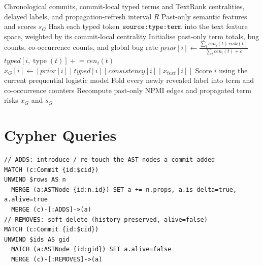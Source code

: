 \documentclass[final,5p,times,twocolumn]{elsarticle}
\DeclareRobustCommand{\code}[1]{%
  \ifmmode
    \text{\normalfont\ttfamily\detokenize{#1}}%
  \else
    {\normalfont\ttfamily\detokenize{#1}}%
  \fi
}
\theoremstyle{plain}
\begin{document}
\begin{algorithm}[!htbp]
\caption{Online CSTG semantic channel}
\label{alg:gchannel}
\small
\begin{algorithmic}[1]
\Require Chronological commits, commit-local typed terms and TextRank centralities,
  delayed labels, and propagation-refresh interval $R$
\Ensure Past-only semantic features and scores $s_G$
\State Hash each typed token $\code{source:type:term}$ into the text feature space,
  weighted by its commit-local centrality
\State Initialise past-only term totals, bug counts, co-occurrence counts, and global bug rate
  \State $prior[i]\gets
    \frac{\sum_t cen_i(t)\,risk(t)}{\sum_t cen_i(t)+\varepsilon}$
    \State $typed[i,\operatorname{type}(t)]\mathrel{+}=cen_i(t)$
  \EndFor
  \State $x_G[i]\gets[prior[i]\mid typed[i]\mid consistency[i]\mid x_{text}[i]]$
  \State Score $i$ using the current prequential logistic model
  \State Fold every newly revealed label into term and co-occurrence counters
    \State Recompute past-only NPMI edges and propagated term risks
  \EndIf
\EndFor
\State \Return $x_G$ and $s_G$
\end{algorithmic}
\end{algorithm}

\FloatBarrier
\section{Cypher Queries}
\label{app:cypher-queries}


\begin{lstlisting}[style=cypher,caption={AST change layer: the delta edges written per commit (\texttt{ADDS} and \texttt{REMOVES} shown; \texttt{UPDATES}/\texttt{MOVES} in Appendix~\ref{app:cypher}).},label={lst:astdelta}]
// ADDS: introduce / re-touch the AST nodes a commit added
MATCH (c:Commit {id:$cid})
UNWIND $rows AS n
  MERGE (a:ASTNode {id:n.id}) SET a += n.props, a.is_delta=true, a.alive=true
  MERGE (c)-[:ADDS]->(a)
// REMOVES: soft-delete (history preserved, alive=false)
MATCH (c:Commit {id:$cid})
UNWIND $ids AS gid
  MATCH (a:ASTNode {id:gid}) SET a.alive=false
  MERGE (c)-[:REMOVES]->(a)
\end{lstlisting}
\end{document}
